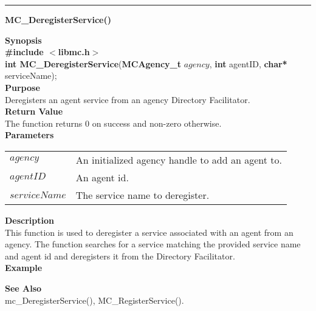 \noindent
\vspace{5pt}
\rule{6.5in}{0.015in}
\noindent
{}
{\LARGE \bf MC\_DeregisterService()}\\
\label{api:MC_DeregisterService()}

\noindent
{\bf Synopsis}\\
{\bf \#include $<$libmc.h$>$}\\
{\bf int MC\_DeregisterService}({\bf MCAgency\_t} $agency$, {\bf int} agentID, {\bf char*} serviceName);\\

\noindent
{\bf Purpose}\\
Deregisters an agent service from an agency Directory Facilitator.\\

\noindent
{\bf Return Value}\\
The function returns 0 on success and non-zero otherwise.\\

\noindent
{\bf Parameters}
\vspace{-0.1in}
\begin{description}
\item
\begin{tabular}{p{23 mm}p{145 mm}} 
$agency$ & An initialized agency handle to add an agent to.\\
$agentID$ & An agent id. \\
$serviceName$ & The service name to deregister.
\end{tabular}
\end{description}

\noindent
{\bf Description}\\
This function is used to deregister a service associated with an agent
from an agency. The function searches for a service matching the
provided service name and agent id and deregisters it from the
Directory Facilitator. \\

\noindent
{\bf Example}\\
\noindent
{\footnotesize}

\noindent
{\bf See Also}\\
mc\_DeregisterService(), MC\_RegisterService().

